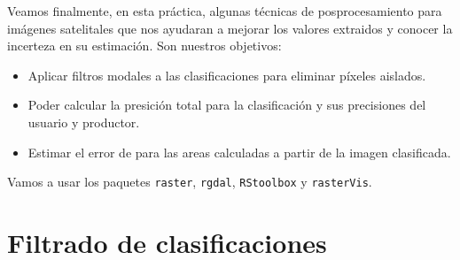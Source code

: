 Veamos finalmente, en esta pr\'actica, algunas t\'ecnicas de posprocesamiento para im\'agenes satelitales que nos ayudaran a mejorar los valores extraidos y conocer la incerteza en su estimaci\'on. Son nuestros objetivos:

\begin{itemize}
  \item Aplicar filtros modales a las clasificaciones para eliminar p\'ixeles aislados.
  \item Poder calcular la presici\'on total para la clasificaci\'on y sus precisiones del usuario y productor.
  \item Estimar el error de para las areas calculadas a partir de la imagen clasificada.
\end{itemize}

Vamos a usar los paquetes \texttt{raster}, \texttt{rgdal}, \texttt{RStoolbox} y \texttt{rasterVis}.

\section{Filtrado de clasificaciones}

